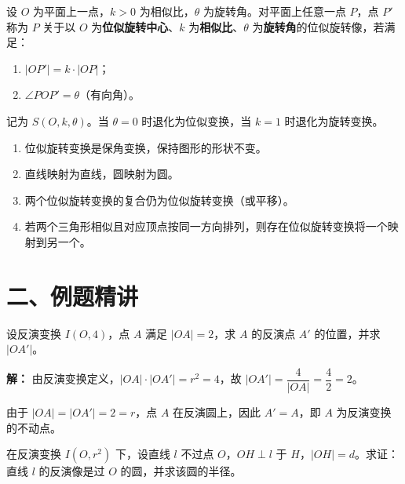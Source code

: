 \documentclass[12pt, a4paper]{ctexart}
\begin{document}
\begin{knowledgebox}[位似旋转变换的定义]
设 $O$ 为平面上一点，$k > 0$ 为相似比，$\theta$ 为旋转角。对平面上任意一点 $P$，点 $P'$ 称为 $P$ 关于以 $O$ 为\textbf{位似旋转中心}、$k$ 为\textbf{相似比}、$\theta$ 为\textbf{旋转角}的位似旋转像，若满足：
\begin{enumerate}[label=(\arabic*)]
  \item $|OP'| = k \cdot |OP|$；
  \item $\angle POP' = \theta$（有向角）。
\end{enumerate}
记为 $S(O, k, \theta)$。当 $\theta = 0$ 时退化为位似变换，当 $k = 1$ 时退化为旋转变换。
\end{knowledgebox}

\begin{tipbox}[位似旋转变换的性质]
\begin{enumerate}[label=(\arabic*)]
  \item 位似旋转变换是保角变换，保持图形的形状不变。
  \item 直线映射为直线，圆映射为圆。
  \item 两个位似旋转变换的复合仍为位似旋转变换（或平移）。
  \item 若两个三角形相似且对应顶点按同一方向排列，则存在位似旋转变换将一个映射到另一个。
\end{enumerate}
\end{tipbox}

\section*{\textcolor{examorange}{二、例题精讲}}

\begin{examplebox}[【例题1】反演点的基本计算]
设反演变换 $I(O, 4)$，点 $A$ 满足 $|OA| = 2$，求 $A$ 的反演点 $A'$ 的位置，并求 $|OA'|$。
\end{examplebox}

\textbf{解：} 由反演变换定义，$|OA| \cdot |OA'| = r^2 = 4$，故 $|OA'| = \dfrac{4}{|OA|} = \dfrac{4}{2} = 2$。

由于 $|OA| = |OA'| = 2 = r$，点 $A$ 在反演圆上，因此 $A' = A$，即 $A$ 为反演变换的不动点。

\begin{examplebox}[【例题2】直线的反演像]
在反演变换 $I(O, r^2)$ 下，设直线 $l$ 不过点 $O$，$OH \perp l$ 于 $H$，$|OH| = d$。求证：直线 $l$ 的反演像是过 $O$ 的圆，并求该圆的半径。
\end{examplebox}
\end{document}
